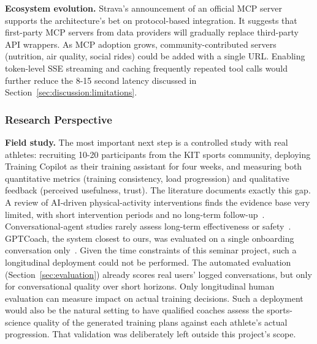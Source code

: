 \textbf{Ecosystem evolution.} Strava's announcement of an official MCP server~\citep{strava_api_update_2026} supports the architecture's bet on protocol-based integration. It suggests that first-party MCP servers from data providers will gradually replace third-party API wrappers. As MCP adoption grows, community-contributed servers (nutrition, air quality, social rides) could be added with a single URL. Enabling token-level SSE streaming and caching frequently repeated tool calls would further reduce the 8-15 second latency discussed in Section~\ref{sec:discussion:limitations}.

\subsubsection{Research Perspective}\label{sec:conclusion:next:research}

\textbf{Field study.} The most important next step is a controlled study with real athletes: recruiting 10-20 participants from the KIT sports community, deploying Training Copilot as their training assistant for four weeks, and measuring both quantitative metrics (training consistency, load progression) and qualitative feedback (perceived usefulness, trust). The literature documents exactly this gap. A review of AI-driven physical-activity interventions finds the evidence base very limited, with short intervention periods and no long-term follow-up~\citep{gabarron_human_2024}. Conversational-agent studies rarely assess long-term effectiveness or safety~\citep{luo_promoting_2021}. GPTCoach, the system closest to ours, was evaluated on a single onboarding conversation only~\citep{joerke_gptcoach_2024}. Given the time constraints of this seminar project, such a longitudinal deployment could not be performed. The automated evaluation (Section~\ref{sec:evaluation}) already scores real users' logged conversations, but only for conversational quality over short horizons. Only longitudinal human evaluation can measure impact on actual training decisions. Such a deployment would also be the natural setting to have qualified coaches assess the sports-science quality of the generated training plans against each athlete's actual progression. That validation was deliberately left outside this project's scope.

